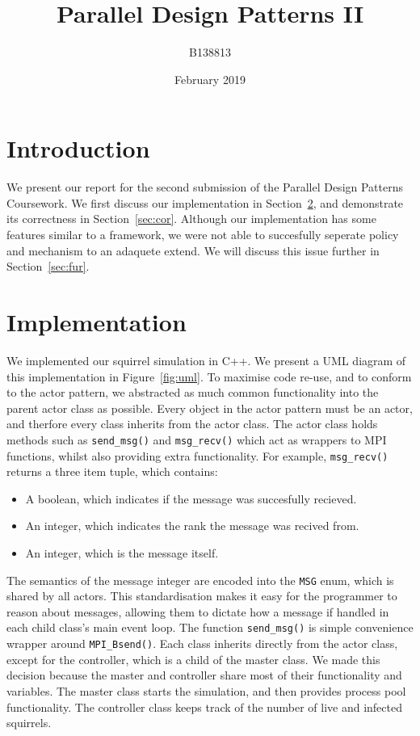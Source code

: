 \documentclass[oneside]{article}
\title{Parallel Design Patterns II}
\author{B138813}
\date{February 2019}
\begin{document}

\maketitle
\section{Introduction}
We present our report for the second submission of the Parallel Design Patterns Coursework. We first discuss our implementation in Section~\ref{sec:imp}, and demonstrate its correctness in Section~\ref{sec:cor}. Although our implementation has some features similar to a framework, we were not able to succesfully seperate policy and mechanism to an adaquete extend. We will discuss this issue further in Section~\ref{sec:fur}.

\section{Implementation}\label{sec:imp}
We implemented our squirrel simulation in C++. We present a UML diagram of this implementation in Figure~\ref{fig:uml}. To maximise code re-use, and to conform to the actor pattern, we abstracted as much common functionality into the parent actor class as possible. Every object in the actor pattern must be an actor, and therfore every class inherits from the actor class. The actor class holds methods such as \texttt{send\_msg()} and \texttt{msg\_recv()} which act as wrappers to MPI functions, whilst also providing extra functionality. For example, \texttt{msg\_recv()} returns a three item tuple, which contains:

\begin{itemize}
  \item A boolean, which indicates if the message was succesfully recieved.
  \item An integer, which indicates the rank the message was recived from.
  \item An integer, which is the message itself.
\end{itemize}
The semantics of the message integer are encoded into the \texttt{MSG} enum, which is shared by all actors. This standardisation makes it easy for the programmer to reason about messages, allowing them to dictate how a message if handled in each child class's main event loop. The function \texttt{send\_msg()} is simple convenience wrapper around \texttt{MPI\_Bsend()}. Each class inherits directly from the actor class, except for the controller, which is a child of the master class. We made this decision because the master and controller share most of their functionality and variables. The master class starts the simulation, and then provides process pool functionality. The controller class keeps track of the number of live and infected squirrels.
\end{document}
